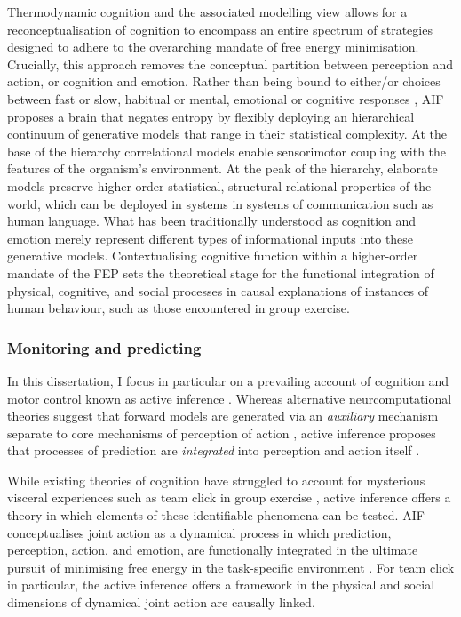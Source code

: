 \begin{CJK}{UTF8}{gbsn}
    Thermodynamic cognition and the associated modelling view allows for a reconceptualisation of cognition to encompass an entire spectrum of strategies designed to adhere to the overarching mandate of free energy minimisation. Crucially, this approach removes the conceptual partition between
    perception and action, or cognition and emotion.  Rather than being bound to either/or choices between fast or slow, habitual or mental, emotional or cognitive responses \citep[see][]{Kahneman2011}, AIF proposes a brain that negates entropy by flexibly deploying an hierarchical continuum of generative models that range in their statistical complexity. At the base of the hierarchy correlational models enable sensorimotor coupling with the features of the organism's environment.  At the peak of the hierarchy, elaborate models preserve higher-order statistical, structural-relational properties of the world, which can be deployed in systems in systems of communication such as human language.  What has been traditionally understood as cognition and emotion merely represent different types of informational inputs into these generative models.  Contextualising cognitive function within a higher-order mandate of the FEP sets the theoretical stage for the functional integration of physical, cognitive, and social processes in causal explanations of instances of human behaviour, such as those encountered in group exercise.







    \subsubsection{Monitoring and predicting}


    In this dissertation, I focus in particular on a prevailing account of cognition and motor control known as active inference \citep{Friston2011}.  Whereas alternative neurcomputational theories suggest that forward models are generated via an \textit{auxiliary} mechanism separate to core mechanisms of perception of action \citep{Wolpert1997}, active inference proposes that processes of prediction are \textit{integrated} into perception and action itself \citep[for a more detailed review of Auxiliary Forward Models and Integrative Forward Models, see Appendix~\ref{app2:motorControl};][]{Pickering2014}.

    While existing theories of cognition have struggled to account for mysterious visceral experiences such as team click in group exercise \citep{Dietrich2004,Slingerland2014}, active inference offers a theory in which elements of these identifiable phenomena can be tested.  AIF conceptualises joint action as a dynamical process in which prediction, perception, action, and emotion, are functionally integrated in the ultimate pursuit of minimising free energy in the task-specific environment \citep{Clark2015}.  For team click in particular, the active inference offers a framework in the physical and social dimensions of dynamical joint action are causally linked.




\end{CJK}
